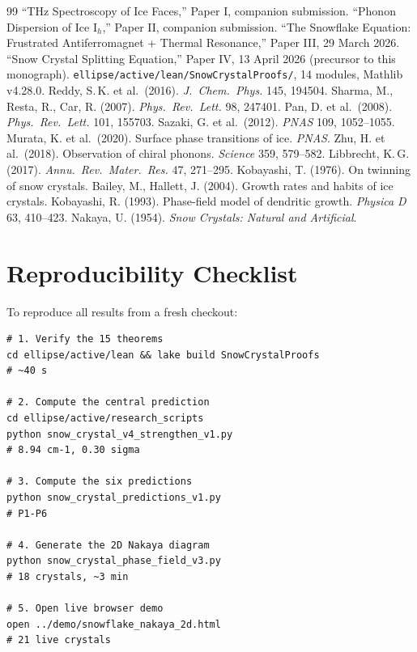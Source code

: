 \documentclass[11pt,a4paper]{article}
\begin{document}
\begin{thebibliography}{99}
\small
{} ``THz Spectroscopy of Ice Faces,'' Paper I, companion submission.
 ``Phonon Dispersion of Ice I$_h$,'' Paper II, companion submission.
 ``The Snowflake Equation: Frustrated Antiferromagnet + Thermal Resonance,'' Paper III, 29 March 2026.
 ``Snow Crystal Splitting Equation,'' Paper IV, 13 April 2026 (precursor to this monograph).
 \texttt{ellipse/active/lean/SnowCrystalProofs/}, 14 modules, Mathlib v4.28.0.
 Reddy, S.\,K. et al.\ (2016). \emph{J.\ Chem.\ Phys.} 145, 194504.
 Sharma, M., Resta, R., Car, R. (2007). \emph{Phys.\ Rev.\ Lett.} 98, 247401.
 Pan, D. et al.\ (2008). \emph{Phys.\ Rev.\ Lett.} 101, 155703.
 Sazaki, G. et al.\ (2012). \emph{PNAS} 109, 1052--1055.
 Murata, K. et al.\ (2020). Surface phase transitions of ice. \emph{PNAS}.
 Zhu, H. et al.\ (2018). Observation of chiral phonons. \emph{Science} 359, 579--582.
 Libbrecht, K.\,G. (2017). \emph{Annu.\ Rev.\ Mater.\ Res.} 47, 271--295.
 Kobayashi, T. (1976). On twinning of snow crystals.
 Bailey, M., Hallett, J. (2004). Growth rates and habits of ice crystals.
 Kobayashi, R. (1993). Phase-field model of dendritic growth. \emph{Physica D} 63, 410--423.
 Nakaya, U. (1954). \emph{Snow Crystals: Natural and Artificial}.
\end{thebibliography}

\appendix

\section{Reproducibility Checklist}

To reproduce all results from a fresh checkout:

\begin{lstlisting}[basicstyle=\ttfamily\scriptsize]
# 1. Verify the 15 theorems
cd ellipse/active/lean && lake build SnowCrystalProofs                # ~40 s

# 2. Compute the central prediction
cd ellipse/active/research_scripts
python snow_crystal_v4_strengthen_v1.py                                # 8.94 cm-1, 0.30 sigma

# 3. Compute the six predictions
python snow_crystal_predictions_v1.py                                  # P1-P6

# 4. Generate the 2D Nakaya diagram
python snow_crystal_phase_field_v3.py                                  # 18 crystals, ~3 min

# 5. Open live browser demo
open ../demo/snowflake_nakaya_2d.html                                  # 21 live crystals
\end{lstlisting}
\end{document}
